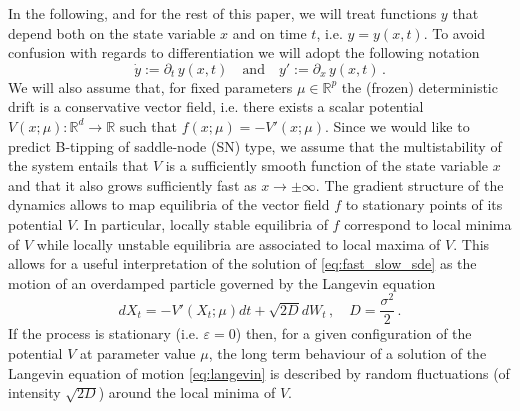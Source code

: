 \documentclass[a4paper,fleqn]{cas-sc}
\begin{document}
In the following, and for the rest of this paper, we will treat functions $y$ that depend both on the state variable $x$ and on time $t$, i.e. $y=y(x,t)$.
To avoid confusion with regards to differentiation we will adopt the following notation
%
\begin{equation*}
        \dot{y}:=\partial_t\,y(x,t)\quad \text{and}\quad y':=\partial_x\,y(x,t)\,.
\end{equation*}
%
We will also assume that, for fixed parameters $\mu\in \mathbb{R}^{p}$ the (frozen) deterministic drift is a conservative vector field, i.e. there exists a scalar potential $V(x;\mu):\mathbb{R}^{d}\to \mathbb{R}$ such that $f(x;\mu) = -V'(x;\mu)$.
Since we would like to predict B-tipping of saddle-node (SN) type, we assume that the multistability of the system entails that $V$ is a sufficiently smooth function of the state variable $x$ and that it also grows sufficiently fast as $x\to\pm\infty$.
The gradient structure of the dynamics allows to map equilibria of the vector field $f$ to stationary points of its potential $V$.
In particular, locally stable equilibria of $f$ correspond to local minima of $V$ while locally unstable equilibria are associated to local maxima of $V$.
This allows for a useful interpretation of the solution of \eqref{eq:fast_slow_sde} as the motion of an overdamped particle governed by the Langevin equation
%
\begin{equation}\label{eq:langevin}
        dX_{t} = -V'(X_{t};\mu)dt + \sqrt{2D}dW_{t}\,,\quad D=\frac{\sigma^{2}}{2}\,.
\end{equation}
%
If the process is stationary (i.e. $\varepsilon=0$) then, for a given configuration of the potential $V$ at parameter value $\mu$, the long term behaviour of a solution of the Langevin equation of motion \eqref{eq:langevin} is described by random fluctuations (of intensity $\sqrt{2D}$) around the local minima of $V$.
%
\end{document}
